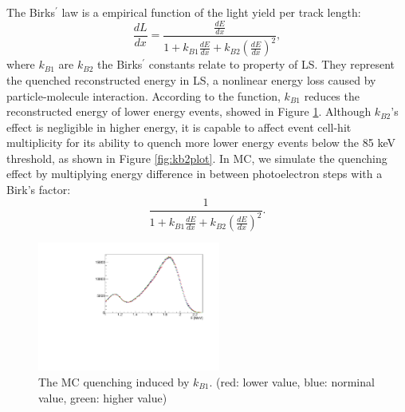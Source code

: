 The Birks$^\prime$ law is a empirical function of the light yield per track length:
\begin{equation}
    \frac{dL}{dx} = \frac{\frac{dE}{dx}}{1+k_{B1}\frac{dE}{dx}+k_{B2}(\frac{dE}{dx})^2},
\end{equation}
where $k_{B1}$ are $k_{B2}$ the Birks$^\prime$ constants relate to property of LS. 
They represent the quenched reconstructed energy in LS, a nonlinear energy loss caused by particle-molecule interaction. 
According to the function, $k_{B1}$ reduces the reconstructed energy of lower energy events, showed in Figure \ref{fig:kb1plot}.
Although $k_{B2}$'s effect is negligible in higher energy, it is capable to affect event cell-hit multiplicity for its ability to quench more lower energy events below the 85 keV threshold, as shown in Figure \ref{fig:kb2plot}.
In MC, we  simulate the quenching effect by multiplying energy difference in between photoelectron steps with a Birk's factor:
\begin{equation}
   \frac{1}{1+k_{B1}\frac{dE}{dx}+k_{B2}(\frac{dE}{dx})^2}.
   \label{eql:birks}
\end{equation}

\begin{figure}[h!]
\centering
\includegraphics[width=60mm]{figures/kb1.pdf}
\caption{The MC quenching induced by $k_{B1}$. (red: lower value, blue: norminal value, green: higher value)}
\label{fig:kb1plot}
\end{figure}
 
